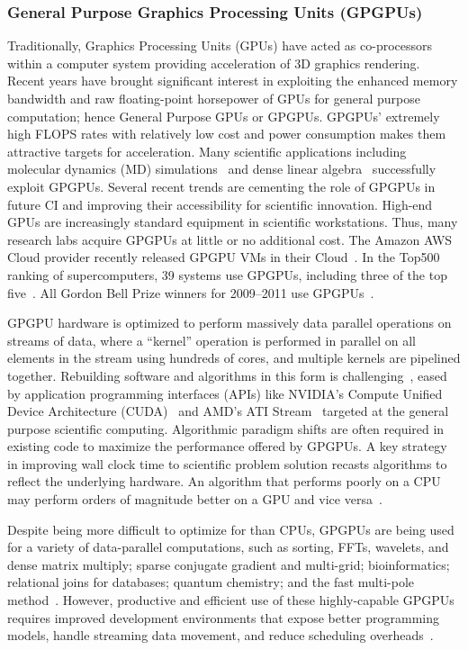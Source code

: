\subsubsection{General Purpose Graphics Processing Units (GPGPUs)}
Traditionally, Graphics Processing Units (GPUs) have acted as co-processors within a computer
system providing acceleration of 3D graphics rendering. 
Recent years have brought significant
interest in exploiting the enhanced memory bandwidth and raw floating-point horsepower of GPUs
for general purpose computation; 
hence General Purpose GPUs or GPGPUs. GPGPUs' extremely
high FLOPS rates with relatively low cost and power consumption makes them attractive targets for
acceleration. 
Many scientific applications including molecular dynamics (MD) simulations~\cite{moleculardynamics} and
dense linear algebra~\cite{denselinearalgebra} successfully exploit GPGPUs. 
Several recent trends are cementing the
role of GPGPUs in future CI and improving their accessibility for scientific innovation. 
High-end GPUs are increasingly standard equipment in scientific workstations. 
Thus, many research labs
acquire GPGPUs at little or no additional cost. 
The Amazon AWS Cloud provider recently released
GPGPU VMs in their Cloud~\cite{AmazonGPU}. 
In the Top500 ranking of supercomputers, 39 systems use
GPGPUs, including three of the top five~\cite{top500:sc11}. 
All Gordon Bell Prize winners for 2009–2011 use 
GPGPUs~\cite{Hamada09,conf/sc/RahimianLVCMMSSVVZB10,Shimokawabe:2011:PPS:2063384.2063388}.

GPGPU hardware is optimized to perform massively data parallel operations on streams of data, where
a ``kernel'' operation is performed in parallel on all elements in the stream using hundreds of cores, and multiple kernels
are pipelined together.
Rebuilding software and algorithms in this form is
challenging~\cite{Yang2007:gpu}, eased by application
programming interfaces (APIs) like NVIDIA’s Compute Unified Device
Architecture (CUDA)~\cite{NVIDIA.cuda.4} and AMD’s ATI
Stream~\cite{ATI.Stream} targeted at the general purpose scientific
computing.
Algorithmic paradigm shifts are often required in existing code to
maximize the performance offered by GPGPUs.
A key strategy in improving wall clock time to scientific problem
solution recasts algorithms to reflect the underlying hardware. 
An algorithm that performs poorly on a CPU may perform orders of
magnitude better on a GPU and vice versa~\cite{Vuduc:2010kx}.

Despite being more difficult to optimize for than CPUs, GPGPUs are being
used for a variety of data-parallel computations, such as sorting, FFTs,
wavelets, and dense matrix multiply; sparse conjugate gradient and
multi-grid; bioinformatics; relational joins for databases; quantum
chemistry; and the fast multi-pole method~\cite{NVIDIA.cuda.community}.
However, productive and efficient use of these highly-capable GPGPUs
requires improved development environments that expose better
programming models, handle streaming data movement, and reduce
scheduling overheads~\cite{AugThiNamWac11CCPE}.

